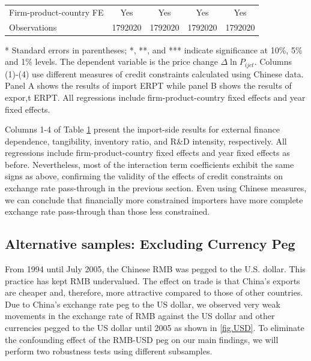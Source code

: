 \documentclass[12pt]{article}
\begin{document}
\begin{table}[htbp]
\begin{threeparttable}
\begin{tabular}{lcccc}
		Firm-product-country FE & Yes   & Yes   & Yes   & Yes \\
		Observations & 1792020 & 1792020 & 1792020 & 1792020 \\
		\bottomrule
	\end{tabular}
	\begin{tablenotes}
		\footnotesize
		\item[*]  Standard errors in parentheses; *, **, and *** indicate significance at 10\%, 5\% and 1\% levels. The dependent variable is the price change $\Delta \ln P_{ijct}$. Columns (1)-(4) use different measures of credit constraints calculated using Chinese data. Panel A shows the results of import ERPT while panel B shows the results of expor,t ERPT. All regressions include firm-product-country fixed effects and year fixed effects.
	\end{tablenotes}
	\end{threeparttable}
        \label{tab.alt.credit}
\end{table}

Columns 1-4 of Table \ref{tab.alt.credit} present the import-side results for external finance dependence, tangibility, inventory ratio, and R\&D intensity, respectively. All regressions include firm-product-country fixed effects and year fixed effects as before. Nevertheless, most of the interaction term coefficients exhibit the same signs as above, confirming the validity of the effects of credit constraints on exchange rate pass-through in the previous section. Even using Chinese measures, we can conclude that financially more constrained importers have more complete exchange rate pass-through than those less constrained.

\subsection{Alternative samples: Excluding Currency Peg}

From 1994 until July 2005, the Chinese RMB was pegged to the U.S. dollar. This practice has kept RMB undervalued. The effect on trade is that China's exports are cheaper and, therefore, more attractive compared to those of other countries. Due to China's exchange rate peg to the US dollar, we observed very weak movements in the exchange rate of RMB against the US dollar and other currencies pegged to the US dollar until 2005 as shown in \ref{fig.USD}. To eliminate the confounding effect of the RMB-USD peg on our main findings, we will perform two robustness tests using different subsamples.
\end{document}
